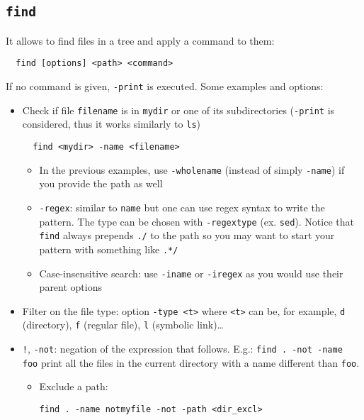 \documentclass[a4paper,12pt,%
              final%
              ]{article}
\begin{document}
\subsection{\texttt{find}}
\label{ssec:find}
It allows to find files in a tree and apply a command to them:
\begin{verbatim}
  find [options] <path> <command>
\end{verbatim}
If no command is given, \texttt{-print} is executed. Some examples and options:
\begin{itemize}
  \item Check if file \texttt{filename} is in \texttt{mydir} or one of its subdirectories (\texttt{-print} is considered, thus it works similarly to \texttt{ls})
\begin{verbatim}
  find <mydir> -name <filename>
\end{verbatim}
  \begin{itemize}
    \item In the previous examples, use \verb|-wholename| (instead of simply \verb|-name|) if you provide the path as well
    \item \verb|-regex|: similar to \texttt{name} but one can use regex syntax to write the pattern. The type can be chosen with \verb|-regextype| (ex. \texttt{sed}). Notice that \texttt{find} always prepends \verb|./| to the path so you may want to start your pattern with something like \verb|.*/|
    \item Case-insensitive search: use \verb|-iname| or \verb|-iregex| as you would use their parent options
  \end{itemize}
  \item Filter on the file type: option \verb|-type <t>| where \texttt{<t>} can be, for example, \texttt{d} (directory), \texttt{f} (regular file), \texttt{l} (symbolic link)\dots
  \item \texttt{!}, \texttt{-not}: negation of the expression that follows. E.g.: \texttt{find . -not -name foo} print all the files in the current directory with a name different than \texttt{foo}.
    \begin{itemize}
      \item Exclude a path:
\begin{verbatim}
find . -name notmyfile -not -path <dir_excl>
\end{verbatim}

\end{itemize}
\end{itemize}
\end{document}
